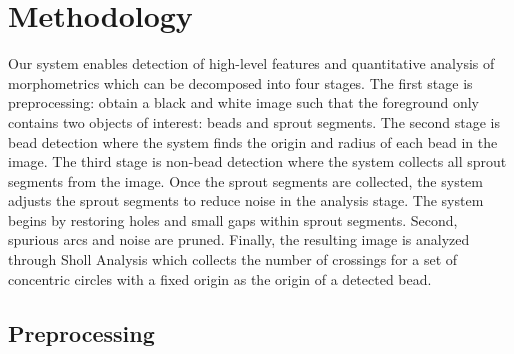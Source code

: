 \documentclass{sig-alternate}
\begin{document}
\section{Methodology} %
\label{sec:Methodology}




	Our system enables detection of high-level features and quantitative
	analysis of morphometrics which can be decomposed into four stages.
	The first stage is preprocessing: obtain a black and white image such
	that the foreground only contains two objects of interest: beads and
	sprout segments. The second stage is bead detection where the system
	finds the origin and radius of each bead in the image.  The third
	stage is non-bead detection where the system collects all sprout
	segments from the image. Once the sprout segments are collected, the
	system adjusts the sprout segments to reduce noise in the analysis
	stage. The system begins by restoring holes and small gaps within
	sprout segments. Second, spurious arcs and noise are pruned. Finally,
	the resulting image is analyzed through Sholl Analysis which collects
	the number of crossings for a set of concentric circles with a fixed
	origin as the origin of a detected bead.


	\subsection{Preprocessing} %
	\label{sub:Preprocessing}
\end{document}
